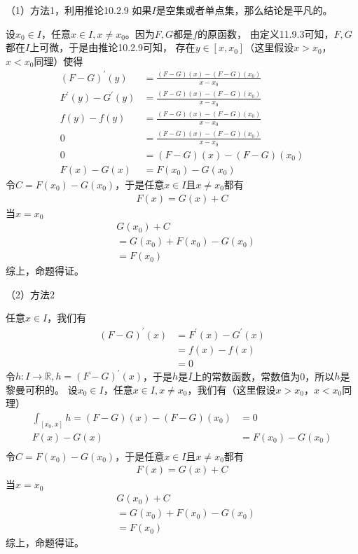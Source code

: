 \documentclass{article}
\begin{document}
（1）方法1，利用推论10.2.9
如果$I$是空集或者单点集，那么结论是平凡的。

设$x_0 \in I$，任意$x \in I, x \neq x_0$。因为$F, G$都是$f$的原函数，
由定义11.9.3可知，$F, G$都在$I$上可微，于是由推论10.2.9可知，
存在$y \in [x, x_0]$（这里假设$x > x_0$，$x < x_0$同理）使得
\begin{align*}
  (F - G)^\prime(y)         & = \frac{(F - G)(x) - (F - G)(x_0)}{x - x_0} \\
  F^\prime(y) - G^\prime(y) & = \frac{(F - G)(x) - (F - G)(x_0)}{x - x_0} \\
  f(y) - f(y)               & = \frac{(F - G)(x) - (F - G)(x_0)}{x - x_0} \\
  0                         & = \frac{(F - G)(x) - (F - G)(x_0)}{x - x_0} \\
  0                         & = (F - G)(x) - (F - G)(x_0)                 \\
  F(x) - G(x)               & = F(x_0) - G(x_0)
\end{align*}
令$C = F(x_0) - G(x_0)$，于是任意$x \in I$且$x \neq x_0$都有
\begin{align*}
  F(x) = G(x) + C
\end{align*}
当$x = x_0$
\begin{align*}
   & G(x_0) + C                 \\
   & = G(x_0) + F(x_0) - G(x_0) \\
   & = F(x_0)
\end{align*}
综上，命题得证。

（2）方法2

任意$x \in I$，我们有
\begin{align*}
  (F - G)^\prime(x) & = F^\prime(x) - G^\prime(x) \\
                    & = f(x) - f(x)               \\
                    & = 0
\end{align*}
令$h : I \to \mathbb{R}, h = (F - G)^\prime(x)$，于是$h$是$I$上的常数函数，常数值为0，所以$h$是黎曼可积的。
设$x_0 \in I$，任意$x \in I, x \neq x_0$，我们有（这里假设$x > x_0$，$x < x_0$同理）
\begin{align*}
  \int_{[x_0, x]} h = (F - G)(x) - (F - G)(x_0) & = 0               \\
  F(x) - G(x)                                   & = F(x_0) - G(x_0) \\
\end{align*}
令$C = F(x_0) - G(x_0)$，于是任意$x \in I$且$x \neq x_0$都有
\begin{align*}
  F(x) = G(x) + C
\end{align*}
当$x = x_0$
\begin{align*}
   & G(x_0) + C                 \\
   & = G(x_0) + F(x_0) - G(x_0) \\
   & = F(x_0)
\end{align*}
综上，命题得证。
\end{document}
